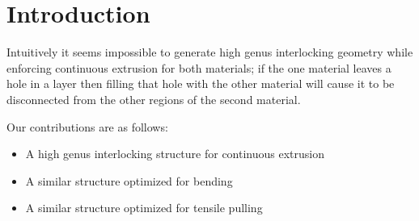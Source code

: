 \section{Introduction}

Intuitively it seems impossible to generate high genus interlocking geometry while enforcing continuous extrusion for both materials;
if the one material leaves a hole in a layer then filling that hole with the other material will cause it to be disconnected from the other regions of the second material.



Our contributions are as follows:
\begin{itemize}
	\item A high genus interlocking structure for continuous extrusion
	\item A similar structure optimized for bending
	\item A similar structure optimized for tensile pulling
\end{itemize}
